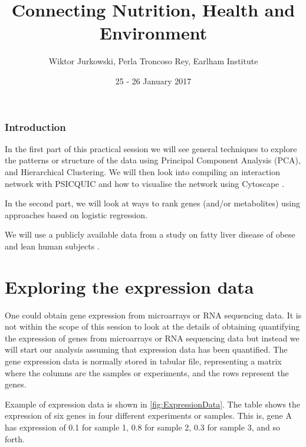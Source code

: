 \documentclass[11pt, oneside]{article}   	%
\title{Connecting Nutrition, Health and Environment }
\author{Wiktor Jurkowski, Perla Troncoso Rey, Earlham Institute}
\date{25 - 26 January 2017}	 %
\begin{document}
\maketitle

\tableofcontents

\listoffigures
\listoftables


\section{Introduction}

In the first part of this practical session we will see general techniques to explore the patterns or structure of the data using Principal Component Analysis (PCA), and Hierarchical Clustering. We will then look into compiling an interaction network with PSICQUIC \cite{Aranda2011} and how to visualise the network using Cytoscape \cite{Shannon2003} \cite{Smoot2011}.

In the second part, we will look at ways to rank genes (and/or metabolites) using approaches based on logistic regression. 

We will use a publicly available data from a study on fatty liver disease of obese and lean human subjects \cite{Wruck2015}.



\part{Exploring the expression data}

One could obtain gene expression from microarrays or RNA sequencing data. It is not within the scope of this session to look at the details of obtaining quantifying the expression of genes from microarrays or RNA sequencing data but instead we will start our analysis assuming that expression data has been quantified.
The gene expression data is normally stored in tabular file, representing a matrix where the columns are the samples or experiments, and the rows represent the genes. 

Example of expression data is shown in \autoref{fig:ExpressionData}. The table shows the expression of six genes in four different experiments or samples. This is, gene A has expression of 0.1 for sample 1, 0.8 for sample 2, 0.3 for sample 3, and so forth. 
\end{document}

